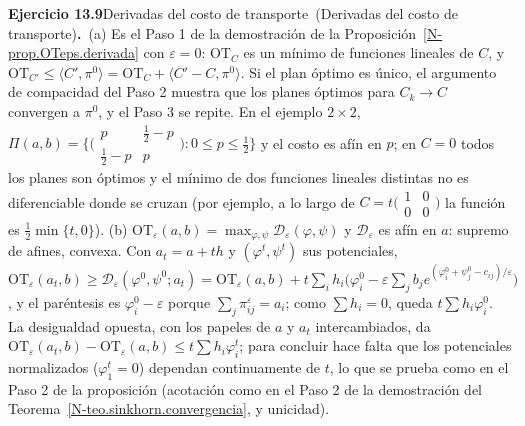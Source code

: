 \documentclass[11pt,a4paper]{amsart}
\newcommand{\ve}{\varepsilon}
\theoremstyle{remark}
\theoremstyle{definition}
\numberwithin{subsection}{section}
\numberwithin{equation}{section}
\newcommand{\ejlabel}[2]{\par\medskip\noindent\textbf{Ejercicio #1}\ifx\relax#2\relax\else\ (#2)\fi\textbf{.}\ }
\begin{document}
\ejlabel{13.9}{Derivadas del costo de transporte}(a) Es el Paso 1 de la demostración de la Proposición~\ref{N-prop.OTeps.derivada} con $\ve=0$: $\mathrm{OT}_C$ es un mínimo de funciones lineales de $C$, y $\mathrm{OT}_{C'}\le\langle C',\pi^0\rangle=\mathrm{OT}_C+\langle C'-C,\pi^0\rangle$. Si el plan óptimo es único, el argumento de compacidad del Paso 2 muestra que los planes óptimos para $C_k\to C$ convergen a $\pi^0$, y el Paso 3 se repite. En el ejemplo $2\times2$, $\Pi(a,b)=\{\bigl(\begin{smallmatrix}p&\frac12-p\\\frac12-p&p\end{smallmatrix}\bigr):0\le p\le\frac12\}$ y el costo es afín en $p$; en $C=0$ todos los planes son óptimos y el mínimo de dos funciones lineales distintas no es diferenciable donde se cruzan (por ejemplo, a lo largo de $C=t\bigl(\begin{smallmatrix}1&0\\0&0\end{smallmatrix}\bigr)$ la función es $\frac12\min\{t,0\}$). (b) $\mathrm{OT}_\ve(a,b)=\max_{\varphi,\psi}\mathcal D_\ve(\varphi,\psi)$ y $\mathcal D_\ve$ es afín en $a$: supremo de afines, convexa. Con $a_t=a+th$ y $(\varphi^t,\psi^t)$ sus potenciales, $\mathrm{OT}_\ve(a_t,b)\ge\mathcal D_\ve(\varphi^0,\psi^0;a_t)=\mathrm{OT}_\ve(a,b)+t\sum_ih_i\bigl(\varphi^0_i-\ve\sum_jb_je^{(\varphi^0_i+\psi^0_j-c_{ij})/\ve}\bigr)$, y el paréntesis es $\varphi^0_i-\ve$ porque $\sum_j\pi^\ve_{ij}=a_i$; como $\sum h_i=0$, queda $t\sum h_i\varphi^0_i$. La desigualdad opuesta, con los papeles de $a$ y $a_t$ intercambiados, da $\mathrm{OT}_\ve(a_t,b)-\mathrm{OT}_\ve(a,b)\le t\sum h_i\varphi^t_i$; para concluir hace falta que los potenciales normalizados ($\varphi^t_1=0$) dependan continuamente de $t$, lo que se prueba como en el Paso 2 de la proposición (acotación como en el Paso 2 de la demostración del Teorema~\ref{N-teo.sinkhorn.convergencia}, y unicidad).
\end{document}
